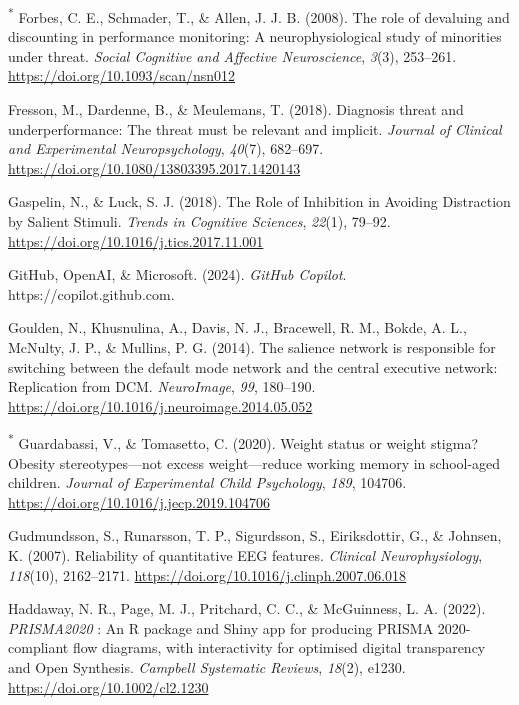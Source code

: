 \documentclass[
  stu, a4paper,floatsintext]{apa7}
\newlength{\cslhangindent}
\newenvironment{CSLReferences}[2] %
 {\begin{list}{}{%
  \setlength{\itemindent}{0pt}
  \setlength{\leftmargin}{0pt}
  \setlength{\parsep}{0pt}
  \ifodd #1
   \setlength{\leftmargin}{\cslhangindent}
   \setlength{\itemindent}{-1\cslhangindent}
  \fi
  \setlength{\itemsep}{#2\baselineskip}}}
 {\end{list}}
\begin{document}
\begin{CSLReferences}{1}{0}
\textsuperscript{*} Forbes, C. E., Schmader, T., \& Allen, J. J. B. (2008). The role of devaluing and discounting in performance monitoring: A neurophysiological study of minorities under threat. \emph{Social Cognitive and Affective Neuroscience}, \emph{3}(3), 253--261. \url{https://doi.org/10.1093/scan/nsn012}

Fresson, M., Dardenne, B., \& Meulemans, T. (2018). Diagnosis threat and underperformance: {The} threat must be relevant and implicit. \emph{Journal of Clinical and Experimental Neuropsychology}, \emph{40}(7), 682--697. \url{https://doi.org/10.1080/13803395.2017.1420143}

Gaspelin, N., \& Luck, S. J. (2018). The {Role} of {Inhibition} in {Avoiding Distraction} by {Salient Stimuli}. \emph{Trends in Cognitive Sciences}, \emph{22}(1), 79--92. \url{https://doi.org/10.1016/j.tics.2017.11.001}

GitHub, OpenAI, \& Microsoft. (2024). \emph{{GitHub Copilot}}. https://copilot.github.com.

Goulden, N., Khusnulina, A., Davis, N. J., Bracewell, R. M., Bokde, A. L., McNulty, J. P., \& Mullins, P. G. (2014). The salience network is responsible for switching between the default mode network and the central executive network: {Replication} from {DCM}. \emph{NeuroImage}, \emph{99}, 180--190. \url{https://doi.org/10.1016/j.neuroimage.2014.05.052}

\textsuperscript{*} Guardabassi, V., \& Tomasetto, C. (2020). Weight status or weight stigma? {Obesity} stereotypes---not excess weight---reduce working memory in school-aged children. \emph{Journal of Experimental Child Psychology}, \emph{189}, 104706. \url{https://doi.org/10.1016/j.jecp.2019.104706}

Gudmundsson, S., Runarsson, T. P., Sigurdsson, S., Eiriksdottir, G., \& Johnsen, K. (2007). Reliability of quantitative {EEG} features. \emph{Clinical Neurophysiology}, \emph{118}(10), 2162--2171. \url{https://doi.org/10.1016/j.clinph.2007.06.018}

Haddaway, N. R., Page, M. J., Pritchard, C. C., \& McGuinness, L. A. (2022). {\emph{PRISMA2020}} : {An R} package and {Shiny} app for producing {PRISMA} 2020-compliant flow diagrams, with interactivity for optimised digital transparency and {Open Synthesis}. \emph{Campbell Systematic Reviews}, \emph{18}(2), e1230. \url{https://doi.org/10.1002/cl2.1230}


\end{CSLReferences}
\end{document}
